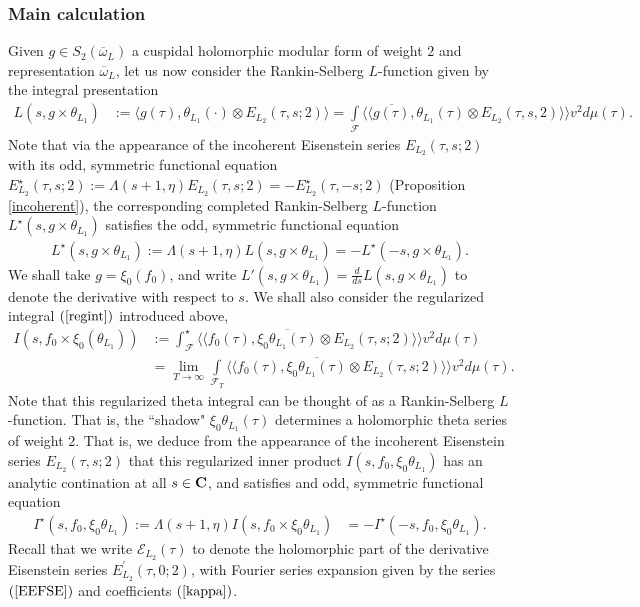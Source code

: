 \documentclass{amsart}
\theoremstyle{definition}
\begin{document}
\subsubsection{Main calculation}

Given $g \in S_{2}(\overline{\omega}_L)$ a cuspidal holomorphic modular form of weight $2$ and representation $\overline{\omega}_L$, 
let us now consider the Rankin-Selberg $L$-function given by the integral presentation 
\begin{align*} L(s, g \times \theta_{L_1}) &:= \langle g (\tau), \theta_{L_1} (\cdot) \otimes E_{L_2}(\tau, s; 2) \rangle
= \int\limits_{\mathcal{F}} \langle \langle \overline{g(\tau)}, \theta_{L_1}(\tau) \otimes E_{L_2}(\tau, s, 2) \rangle \rangle v^2 d\mu(\tau). \end{align*}
Note that via the appearance of the incoherent Eisenstein series $E_{L_2}(\tau, s; 2)$ with its odd, symmetric functional equation
$E^{\star}_{L_2}(\tau, s; 2) := \Lambda(s+1, \eta) E_{L_2}(\tau, s; 2) = - E^{\star}_{L_2}(\tau, -s; 2)$ (Proposition \ref{incoherent}), 
the corresponding completed Rankin-Selberg $L$-function $L^{\star}(s, g \times \theta_{L_1})$ satisfies the odd, symmetric functional equation 
\begin{align}\label{LFE} L^{\star}(s, g \times \theta_{L_1}) := \Lambda(s+1, \eta)L(s, g \times \theta_{L_1}) = -L^{\star}(-s, g \times \theta_{L_1}). \end{align}
We shall take $g = \xi_0(f_0)$, and write $L'(s, g \times \theta_{L_1}) = \frac{d}{ds} L(s, g \times \theta_{L_1})$ to denote the derivative with respect to $s$. 
We shall also consider the regularized integral $(\ref{regint})$ introduced above, 
\begin{equation*}\begin{aligned}  I(s, f_{0} \times \xi_0(\theta_{L_{1}})) &:=
\int_{\mathcal{F}}^{\star} \langle \langle f_{0}(\tau), \overline{\xi_0\theta_{L_{1}}(\tau)} \otimes E_{L_{2}}(\tau, s; 2) \rangle \rangle v^2 d \mu (\tau) \\
&= \lim_{T \rightarrow \infty} \int\limits_{\mathcal{F}_T}  \langle \langle f_{0}(\tau), \overline{\xi_0\theta_{L_{1}}(\tau)} \otimes E_{L_{2}}(\tau, s; 2) \rangle \rangle v^2 d \mu(\tau). \end{aligned}\end{equation*}
Note that this regularized theta integral can be thought of as a Rankin-Selberg $L$-function. 
That is, the ``shadow" $\xi_0\theta_{L_1}(\tau)$ determines a holomorphic theta series of weight $2$.
That is, we deduce from the appearance of the incoherent Eisenstein series $E_{L_2}(\tau, s; 2)$ that this regularized inner product $I(s, f_0, \xi_0 \theta_{L_1})$ has an analytic 
contination at all $s \in {\bf{C}}$, and satisfies and odd, symmetric functional equation 
\begin{align}\label{IFE} I^{\star}(s, f_0, \xi_0 \theta_{L_1}):= \Lambda(s+1, \eta) I(s, f_0 \times \xi_0 \theta_{L_1}) &= - I^{\star}(-s, f_0, \xi_0 \theta_{L_1}).\end{align} 
Recall that we write $\mathcal{E}_{L_2}(\tau)$ to denote the holomorphic part of the derivative Eisenstein series $E^{\prime}_{L_2}(\tau, 0; 2)$,
with Fourier series expansion given by the series $(\ref{EEFSE})$ and coefficients $(\ref{kappa})$. 
\end{document}
